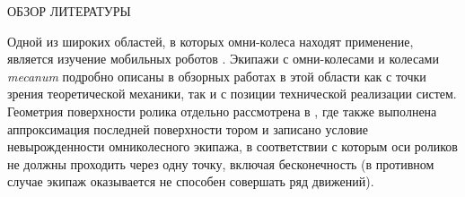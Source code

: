 ОБЗОР ЛИТЕРАТУРЫ

Одной из широких областей, в которых омни-колеса находят применение, является изучение мобильных роботов \cite{Seeni2010,Martynenko2005,Martynenko2007,GolubevSnake2004}. Экипажи с омни-колесами и колесами \textit{mecanum} \cite{Ilon} подробно описаны в обзорных работах в этой области \cite{Campion1996,Zimmermann2009,ChungIagnemma2016,Kanjanawanishkul2015,Adascalitei2011} как с точки зрения теоретической механики, так и с позиции технической реализации систем. Геометрия поверхности ролика отдельно рассмотрена в \cite{Gfrerrer2008}, где также выполнена аппроксимация последней поверхности тором и записано условие невырожденности омниколесного экипажа, в соответствии с которым оси роликов не должны проходить через одну точку, включая бесконечность (в противном случае экипаж оказывается не способен совершать ряд движений).

